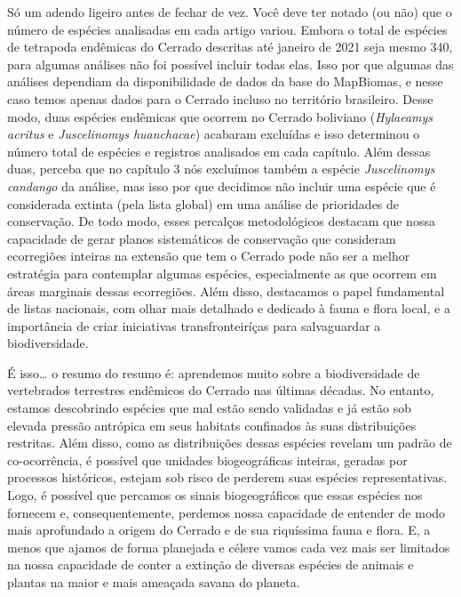 \documentclass[12pt,openright,oneside,a4paper,english]{abntex2}
\begin{document}
Só um adendo ligeiro antes de fechar de vez. Você deve ter notado (ou não) que o número de espécies analisadas em cada artigo variou. Embora o total de espécies de tetrapoda endêmicas do Cerrado descritas até janeiro de 2021 seja mesmo 340, para algumas análises não foi possível incluir todas elas. Isso por que algumas das análises dependiam da disponibilidade de dados da base do MapBiomas, e nesse caso temos apenas dados para o Cerrado incluso no território brasileiro. Desse modo, duas espécies endêmicas que ocorrem no Cerrado boliviano (\textit{Hylaeamys acritus} e \textit{Juscelinomys huanchacae}) acabaram excluídas e isso determinou o número total de espécies e registros analisados em cada capítulo. Além dessas duas, perceba que no capítulo 3 nós excluímos também a espécie \textit{Juscelinomys candango} da análise, mas isso por que decidimos não incluir uma espécie que é considerada extinta (pela lista global) em uma análise de prioridades de conservação. De todo modo, esses percalços metodológicos destacam que nossa capacidade de gerar planos sistemáticos de conservação que consideram ecorregiões inteiras na extensão que tem o Cerrado pode não ser a melhor estratégia para contemplar algumas espécies, especialmente as que ocorrem em áreas marginais dessas ecorregiões. Além disso, destacamos o papel fundamental de listas nacionais, com olhar mais detalhado e dedicado à fauna e flora local, e a importância de criar iniciativas transfronteiríças para salvaguardar a biodiversidade.

É isso… o resumo do resumo é: aprendemos muito sobre a biodiversidade de vertebrados terrestres endêmicos do Cerrado nas últimas décadas. No entanto, estamos descobrindo espécies que mal estão sendo validadas e já estão sob elevada pressão antrópica em seus habitats confinados às suas distribuições restritas. Além disso, como as distribuições dessas espécies revelam um padrão de co-ocorrência, é possível que unidades biogeográficas inteiras, geradas por processos históricos, estejam sob risco de perderem suas espécies representativas. Logo, é possível que percamos os sinais biogeográficos que essas espécies nos fornecem e, consequentemente, perdemos nossa capacidade de entender de modo mais aprofundado a origem do Cerrado e de sua riquíssima fauna e flora. E, a menos que ajamos de forma planejada e célere vamos cada vez mais ser limitados na nossa capacidade de conter a extinção de diversas espécies de animais e plantas na maior e mais ameaçada savana do planeta. 


\end{document}
